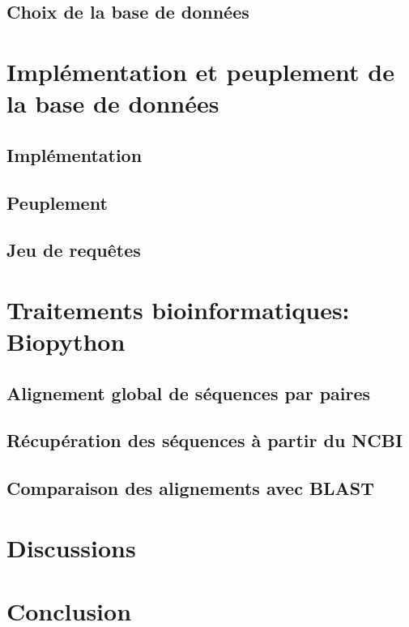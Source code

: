 \documentclass[a4paper, 11pt]{article}
\begin{document}
\subsection{Choix de la base de données}
\newpage
\section{Implémentation et peuplement de la base de données}
\subsection{Implémentation}
\subsection{Peuplement}
\subsection{Jeu de requêtes}
\newpage
\section{Traitements bioinformatiques: Biopython}
\subsection{Alignement global de séquences par paires}
\subsection{Récupération des séquences à partir du NCBI}
\subsection{Comparaison des alignements avec BLAST}
\newpage
\section{Discussions}
\newpage
\section{Conclusion}
\end{document}
